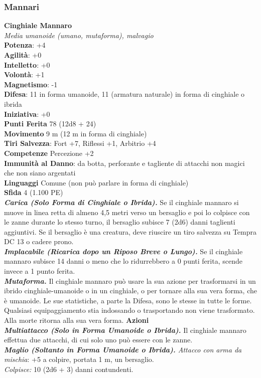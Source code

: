 \begin{multicols}{2}
\subsubsection{Mannari}

\medskip\textbf{Cinghiale Mannaro}\\
\emph{Media umanoide (umano, mutaforma), malvagio} \\
\textbf{Potenza}: +4\\
\textbf{Agilità}: +0\\
\textbf{Intelletto}: +0\\
\textbf{Volontà}: +1\\
\textbf{Magnetismo}: -1\\
\textbf{Difesa}: 11 in forma umanoide, 11 (armatura naturale) in forma di cinghiale o ibrida\\ \textbf{Iniziativa}: +0\\
\textbf{Punti Ferita} 78 (12d8 + 24)\\
\textbf{Movimento} 9 m (12 m in forma di cinghiale)\\
\textbf{Tiri Salvezza}: Fort +7, Riflessi +1, Arbitrio +4\\
\textbf{Competenze} Percezione +2\\
\textbf{Immunità al Danno}: da botta, perforante e tagliente di attacchi non magici che non siano argentati\\
\textbf{Linguaggi} Comune (non può parlare in forma di cinghiale)\\
\textbf{Sfida} 4 (1.100 PE)\smallskip\\
\emph{\textbf{Carica (Solo Forma di Cinghiale o Ibrida).}} Se il cinghiale mannaro si muove in linea retta di almeno 4,5 metri verso un bersaglio e poi lo colpisce con le zanne durante lo stesso turno, il bersaglio subisce 7 (2d6) danni taglienti aggiuntivi. Se il bersaglio è una creatura, deve riuscire un tiro salvezza su Tempra DC 13 o cadere prono.\\
\emph{\textbf{Implacabile (Ricarica dopo un Riposo Breve o Lungo).}} Se il cinghiale mannaro subisce 14 danni o meno che lo ridurrebbero a 0 punti ferita, scende invece a 1 punto ferita.\\
\emph{\textbf{Mutaforma.}} Il cinghiale mannaro può usare la sua azione per trasformarsi in un ibrido cinghiale-umanoide o in un cinghiale, o per tornare alla sua vera forma, che è umanoide. Le sue statistiche, a parte la Difesa, sono le stesse in tutte le forme. Qualsiasi equipaggiamento stia indossando o trasportando non viene trasformato. Alla morte ritorna alla sua vera forma.
\smallskip\textbf{Azioni}\\
\emph{\textbf{Multiattacco (Solo in Forma Umanoide o Ibrida).}} Il cinghiale mannaro effettua due attacchi, di cui solo uno può essere con le zanne.\\
\emph{\textbf{Maglio (Soltanto in Forma Umanoide o Ibrida).} Attacco con arma da mischia}: +5 a colpire, portata 1 m, un bersaglio. \\
\emph{Colpisce:} 10 (2d6 + 3) danni contundenti.\\


\end{multicols}

